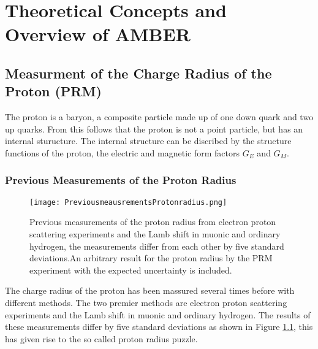\chapter{Theoretical Concepts and Overview of AMBER}\label{cha:theory}


\section{Measurment of the Charge Radius of the Proton (PRM)}\label{sec:proton_radius}
The proton is a baryon, a composite particle made up of one down quark and  two up quarks.
From this follows that the proton is not a point particle, but has an internal sturucture.\autocite{Workman:2836514}
\newline
The internal structure can be discribed by the structure functions of the proton, 
the electric and magnetic form factors $G_E$ and $G_M$.\autocite{ProposalAmber}	
\subsection{Previous Measurements of the Proton Radius}
\begin{figure}[h]
	\centering
	\texttt{[image: PreviousmeausrementsProtonradius.png]}
	\caption{Previous measurements of the proton radius from electron proton  scattering experiments and the Lamb shift in muonic and ordinary hydrogen,
	 the measurements differ from each other by five standard deviations.An arbitrary result for the proton radius by the PRM experiment with the expected uncertainty is included.\autocite{ProposalAmber} }
	\label{fig:previous_proton_radius}
\end{figure}

The charge radius of the proton has been massured several times before with different methods.
The two premier methods are electron proton scattering experiments and the Lamb shift in muonic and ordinary hydrogen.
The results of these measurements differ by five standard deviations as shown in Figure \ref{fig:previous_proton_radius},
this has given rise to the so called proton radius puzzle.\autocite{ProposalAmber}

